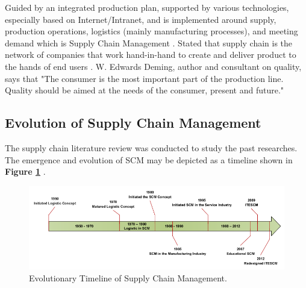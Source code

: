\documentclass[12pt,a4paper,final]{iopart}
\begin{document}
Guided by an integrated production plan, supported by various technologies, especially based on Internet/Intranet, and is implemented around supply, production operations, logistics (mainly manufacturing processes), and meeting demand which is Supply Chain Management \cite{Li2018}. Stated that supply chain is the network of companies that work hand-in-hand to create and deliver product to the hands of end users \cite{Sampouw}. W. Edwards Deming, author and consultant on quality, says that "The consumer is the most important part of the production line. Quality should be aimed at the needs of the consumer, present and future." \cite{Rusell2011}

\subsection{Evolution of Supply Chain Management}
The supply chain literature review was conducted to study the past researches. The emergence and evolution of SCM may be depicted as a timeline shown in \textbf{Figure \ref{figureEvolution}} \cite{Habib2019}.

\begin{figure}[htb!]
	\centering
	\includegraphics[width=1.0\textwidth]
		{evolution.png}
	\caption{\label{figureEvolution}Evolutionary Timeline of Supply Chain Management.}
\end{figure}
\end{document}
